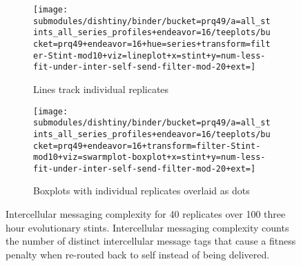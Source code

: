 \begin{figure}
\begin{center}

\begin{subfigure}[b]{\textwidth}
\centering
\texttt{[image: submodules/dishtiny/binder/bucket=prq49/a=all\_stints\_all\_series\_profiles+endeavor=16/teeplots/bucket=prq49+endeavor=16+hue=series+transform=filter-Stint-mod10+viz=lineplot+x=stint+y=num-less-fit-under-inter-self-send-filter-mod-20+ext=]}%
\caption{
Lines track individual replicates
}
\label{fig:inter-messaging-complexity-vs-stint-lineplot}
\end{subfigure}

\begin{subfigure}[b]{\columnwidth}
\centering
\texttt{[image: submodules/dishtiny/binder/bucket=prq49/a=all\_stints\_all\_series\_profiles+endeavor=16/teeplots/bucket=prq49+endeavor=16+transform=filter-Stint-mod10+viz=swarmplot-boxplot+x=stint+y=num-less-fit-under-inter-self-send-filter-mod-20+ext=]}
\caption{
Boxplots with individual replicates overlaid as dots
}
\label{fig:inter-messaging-complexity-vs-stint-boxplot}
\end{subfigure}

\caption{
Intercellular messaging complexity for 40 replicates over 100 three hour evolutionary stints.
Intercellular messaging complexity counts the number of distinct intercellular message tags that cause a fitness penalty when re-routed back to self instead of being delivered.
}
\label{fig:inter-messaging-complexity-vs-stint}

\end{center}
\end{figure}
